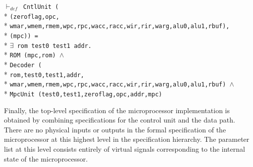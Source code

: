 \begin{normalsize}
\hspace*{\fill}
\begin{minipage}{17cm}
$\vdash_{def}$\verb" CntlUnit ("\\*
\verb"(zeroflag,opc,"\\*
\verb"wmar,wmem,rmem,wpc,rpc,wacc,racc,wir,rir,warg,alu0,alu1,rbuf),"\\*
\verb"(mpc)) ="\\*
$\exists$\verb" rom test0 test1 addr."\\*
\verb"ROM (mpc,rom) "$\wedge$\\*
\verb"Decoder ("\\*
\verb"rom,test0,test1,addr,"\\*
\verb"wmar,wmem,rmem,wpc,rpc,wacc,racc,wir,rir,warg,alu0,alu1,rbuf) "$\wedge$\\*
\verb"MpcUnit (test0,test1,zeroflag,opc,addr,mpc)"
\end{minipage}
\hspace*{\fill}

Finally, the top-level specification of the microprocessor implementation
is obtained by combining specifications for the control unit and the
data path.
There are no physical inputs or outputs in the formal specification
of the microprocessor at this highest level in the specification
hierarchy.  The parameter list at this level consists entirely of
virtual signals corresponding to the internal state of the microprocessor.


\end{normalsize}
